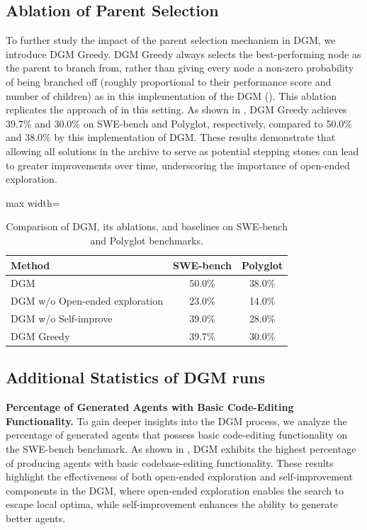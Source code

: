 \subsection{Ablation of Parent Selection}
To further study the impact of the parent selection mechanism in DGM, we introduce DGM Greedy. DGM Greedy always selects the best-performing node as the parent to branch from, rather than giving every node a non-zero probability of being branched off (roughly proportional to their performance score and number of children) as in this implementation of the DGM (). This ablation replicates the approach of \citet{robeyns2025self} in this setting. As shown in , DGM Greedy achieves 39.7\% and 30.0\% on SWE-bench and Polyglot, respectively, compared to 50.0\% and 38.0\% by this implementation of DGM. These results demonstrate that allowing all solutions in the archive to serve as potential stepping stones can lead to greater improvements over time, underscoring the importance of open-ended exploration.

\begin{table}[H]
\centering
\caption{Comparison of DGM, its ablations, and baselines on SWE-bench and Polyglot benchmarks.}
\label{tab:DGM-greedy}
\begin{adjustbox}{max width=\textwidth} %
\begin{tabular}{lcc}
\toprule
\textbf{Method} & \textbf{SWE-bench} & \textbf{Polyglot} \\
\midrule
DGM & 50.0\% & 38.0\% \\
DGM w/o Open-ended exploration & 23.0\% & 14.0\% \\
DGM w/o Self-improve & 39.0\% & 28.0\% \\
DGM Greedy & 39.7\% & 30.0\% \\
\bottomrule
\end{tabular}
\end{adjustbox}
\end{table}

\subsection{Additional Statistics of DGM runs}
\textbf{Percentage of Generated Agents with Basic Code-Editing Functionality.}
To gain deeper insights into the DGM process, we analyze the percentage of generated agents that possess basic code-editing functionality on the SWE-bench benchmark. As shown in , DGM exhibits the highest percentage of producing agents with basic codebase-editing functionality. These results highlight the effectiveness of both open-ended exploration and self-improvement components in the DGM, where open-ended exploration enables the search to escape local optima, while self-improvement enhances the ability to generate better agents.

